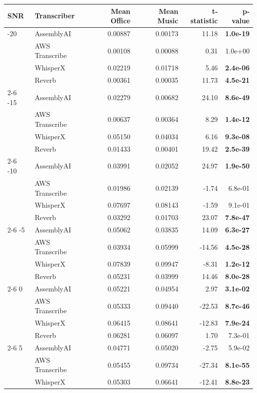 \begin{tabular}{llrrrr}
\toprule
SNR & Transcriber & Mean Office & Mean Music & t-statistic & p-value \\
\midrule
-20 & AssemblyAI & 0.00887 & 0.00173 & 11.18 & \textbf{ 1.0e-19} \\
  & AWS Transcribe & 0.00108 & 0.00088 & 0.31 &  1.0e+00 \\
  & WhisperX & 0.02219 & 0.01718 & 5.46 & \textbf{ 2.4e-06} \\
  & Reverb & 0.00361 & 0.00035 & 11.73 & \textbf{ 4.5e-21} \\
\cmidrule(r){2-6}
-15 & AssemblyAI & 0.02279 & 0.00682 & 24.10 & \textbf{ 8.6e-49} \\
  & AWS Transcribe & 0.00637 & 0.00364 & 8.29 & \textbf{ 1.4e-12} \\
  & WhisperX & 0.05150 & 0.04034 & 6.16 & \textbf{ 9.3e-08} \\
  & Reverb & 0.01433 & 0.00401 & 19.42 & \textbf{ 2.5e-39} \\
\cmidrule(r){2-6}
-10 & AssemblyAI & 0.03991 & 0.02052 & 24.97 & \textbf{ 1.9e-50} \\
  & AWS Transcribe & 0.01986 & 0.02139 & -1.74 &  6.8e-01 \\
  & WhisperX & 0.07697 & 0.08143 & -1.59 &  9.1e-01 \\
  & Reverb & 0.03292 & 0.01703 & 23.07 & \textbf{ 7.8e-47} \\
\cmidrule(r){2-6}
-5 & AssemblyAI & 0.05062 & 0.03835 & 14.09 & \textbf{ 6.3e-27} \\
  & AWS Transcribe & 0.03934 & 0.05999 & -14.56 & \textbf{ 4.5e-28} \\
  & WhisperX & 0.07839 & 0.09947 & -8.31 & \textbf{ 1.2e-12} \\
  & Reverb & 0.05231 & 0.03999 & 14.46 & \textbf{ 8.0e-28} \\
\cmidrule(r){2-6}
0 & AssemblyAI & 0.05221 & 0.04954 & 2.97 & \textbf{ 3.1e-02} \\
  & AWS Transcribe & 0.05333 & 0.09440 & -22.53 & \textbf{ 8.7e-46} \\
  & WhisperX & 0.06415 & 0.08641 & -12.83 & \textbf{ 7.9e-24} \\
  & Reverb & 0.06281 & 0.06097 & 1.70 &  7.3e-01 \\
\cmidrule(r){2-6}
5 & AssemblyAI & 0.04771 & 0.05020 & -2.75 &  5.9e-02 \\
  & AWS Transcribe & 0.05455 & 0.09734 & -27.34 & \textbf{ 8.1e-55} \\
  & WhisperX & 0.05303 & 0.06641 & -12.41 & \textbf{ 8.8e-23} \\

\end{tabular}
